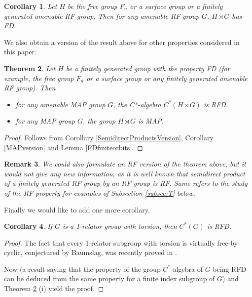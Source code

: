 \documentclass[11 pt, leqno, hidelinks]{amsart}%
\newtheorem{theorem}{Theorem}[section]
\theoremstyle{plain}
\newtheorem{corollary}[theorem]{Corollary}
\newtheorem{remark}[theorem]{Remark}
\numberwithin{equation}{section}
\begin{document}
\begin{corollary} Let $H$ be  the free group $F_n$ or a surface group or a finitely generated amenable RF group. Then for any amenable RF group $G$, $H\rtimes G$ has FD.
\end{corollary}




We also obtain a version of the result above for other properties considered in this paper.


\begin{theorem}\label{FD} Let $H$ be a finitely generated group with the property FD (for example, the free group $F_n$ or a surface group or any finitely generated amenable RF group). Then
 \begin{itemize}
\item [(i)] for any  amenable MAP group $G$, the C*-algebra
$C^*(H\rtimes G)$ is RFD.

\item [(ii)] for any MAP group $G$, the group $H\rtimes G$ is MAP.
\end{itemize}
\end{theorem}
\begin{proof} Follows from Corollary  \ref{SemidirectProductsVersion}, Corollary \ref{MAPversion} and  Lemma  \ref{FDfiniteorbits}.
\end{proof}


\begin{remark} We could also formulate an RF version of the theorem above, but it would  not give any new information, as it is well known that semidirect product of a finitely generated RF group by an RF group is RF. Same refers to the study of the RF property for examples of Subsection \ref{subsec:T} below.
\end{remark}



Finally we would like to add one more corollary.


\begin{corollary}
	If $G$ is a  1-relator group with torsion, then $C^*(G)$ is RFD.
\end{corollary}
\begin{proof}
	The fact that every 1-relator subgroup with torsion is virtually free-by-cyclic, conjectured by Baumslag, was recently proved in \cite{KL}.
	
	Now \cite[Lemma 4.6]{BekkaLouvet} (a result saying that the property of the group $C^*$-algebra of $G$ being RFD can be deduced from the same property for a finite index subgroup of $G$) and Theorem \ref{FD} (i) yield the proof.
	
\end{proof}
\end{document}
